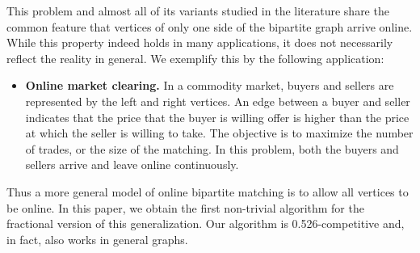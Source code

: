 \documentclass{article}
\begin{document}
This problem and almost all of its variants studied in the literature share the common feature that vertices of only one side of the bipartite graph arrive online. While this property indeed holds in many applications, it does not necessarily reflect the reality in general. We exemplify this by the following application:
\begin{itemize}

\item {\bf Online market clearing.} In a commodity market, buyers and sellers are represented by the left and right vertices. An edge between a buyer and seller indicates that the price that the buyer is willing offer is higher than the price at which the seller is willing to take. The objective is to maximize the number of trades, or the size of the matching. In this problem, both the buyers and sellers arrive and leave online continuously.

\end{itemize}
Thus a more general model of online bipartite matching is to allow all vertices to be online. In this paper, we obtain the first non-trivial algorithm for the fractional version of this generalization. Our algorithm is 0.526-competitive and, in fact, also works in general graphs.
\end{document}
